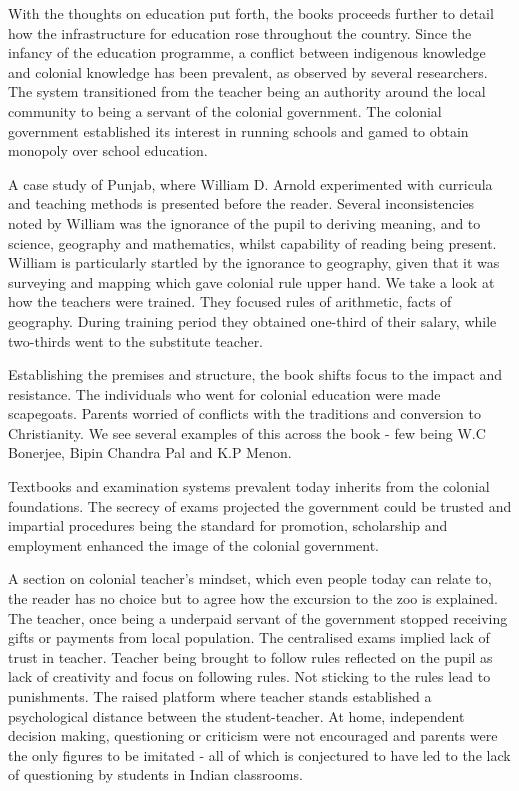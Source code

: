\documentclass[a4paper,twocolumn]{article}
\begin{document}
    With the thoughts on education put forth, the books
    proceeds further to detail how the infrastructure
    for education rose throughout the country. Since the
    infancy of the education programme, a conflict
    between indigenous knowledge and colonial knowledge
    has been prevalent, as observed by several
    researchers. The system transitioned from the
    teacher being an authority around the local
    community to being a servant of the colonial
    government. The colonial government established its
    interest in running schools and gamed to obtain
    monopoly over school education.


    A case study of Punjab, where William D. Arnold
    experimented with curricula and teaching methods is
    presented before the reader. Several inconsistencies
    noted by William was the ignorance of the pupil to
    deriving meaning, and to science, geography and
    mathematics, whilst capability of reading being
    present. William is particularly startled by the
    ignorance to geography, given that it was surveying
    and mapping which gave colonial rule upper hand. We
    take a look at how the teachers were trained. They
    focused rules of arithmetic, facts of geography.
    During training period they obtained one-third of
    their salary, while two-thirds went to the
    substitute teacher.


    Establishing the premises and structure, the book
    shifts focus to the impact and resistance. The
    individuals who went for colonial education were
    made scapegoats. Parents worried of conflicts with
    the traditions and conversion to Christianity. We
    see several examples of this across the book - few
    being W.C Bonerjee, Bipin Chandra Pal and K.P Menon.


    Textbooks and examination systems prevalent today
    inherits from the colonial foundations. The secrecy
    of exams projected the government could be trusted
    and impartial procedures being the standard for
    promotion, scholarship and employment enhanced the
    image of the colonial government.


    A section on colonial teacher's mindset, which even
    people today can relate to, the reader has no choice
    but to agree how the excursion to the zoo is
    explained. The teacher, once being a underpaid
    servant of the government stopped receiving gifts or
    payments from local population. The centralised
    exams implied lack of trust in teacher. Teacher
    being brought to follow rules reflected on the pupil
    as lack of creativity and focus on following rules.  
    Not sticking to the rules lead to punishments. The
    raised platform where teacher stands established a
    psychological distance between the student-teacher.
    At home, independent decision making, questioning or
    criticism were not encouraged and parents were the
    only figures to be imitated - all of which is
    conjectured to have led to the lack of questioning
    by students in Indian classrooms.
\end{document}
